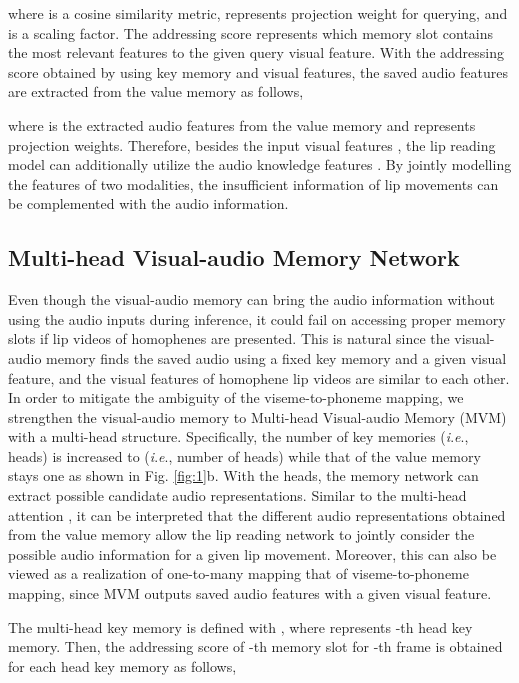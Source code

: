 \documentclass[letterpaper]{article} \usepackage{aaai22}  \usepackage{times}  \usepackage{helvet}  \usepackage{courier}  \usepackage[hyphens]{url}  \usepackage{graphicx} \urlstyle{rm} \def\UrlFont{\rm}  \usepackage{natbib}  \usepackage{caption} \DeclareCaptionStyle{ruled}{labelfont=normalfont,labelsep=colon,strut=off} \frenchspacing  \setlength{\pdfpagewidth}{8.5in}  \setlength{\pdfpageheight}{11in}  \usepackage{algorithm}
\newcommand{\ie}{\textit{i}.\textit{e}.}
\begin{document}
where  is a cosine similarity metric,  represents projection weight for querying, and  is a scaling factor. The addressing score represents which memory slot contains the most relevant features to the given query visual feature. With the addressing score  obtained by using key memory and visual features, the saved audio features are extracted from the value memory as follows,


where  is the extracted audio features from the value memory and  represents projection weights. Therefore, besides the input visual features , the lip reading model can additionally utilize the audio knowledge features . By jointly modelling the features of two modalities, the insufficient information of lip movements can be complemented with the audio information.

\subsection{Multi-head Visual-audio Memory Network}
\label{sec:3.2}
Even though the visual-audio memory can bring the audio information without using the audio inputs during inference, it could fail on accessing proper memory slots if lip videos of homophenes are presented. This is natural since the visual-audio memory finds the saved audio using a fixed key memory and a given visual feature, and the visual features of homophene lip videos are similar to each other. In order to mitigate the ambiguity of the viseme-to-phoneme mapping, we strengthen the visual-audio memory to Multi-head Visual-audio Memory (MVM) with a multi-head structure. Specifically, the number of key memories (\ie, heads) is increased to  (\ie, number of heads) while that of the value memory stays one \cite{lample2019mhmattention} as shown in Fig. \ref{fig:1}b. With the  heads, the memory network can extract possible candidate audio representations. Similar to the multi-head attention \cite{vaswani2017attention}, it can be interpreted that the  different audio representations obtained from the value memory allow the lip reading network to jointly consider the possible audio information for a given lip movement. Moreover, this can also be viewed as a realization of one-to-many mapping that of viseme-to-phoneme mapping, since MVM outputs  saved audio features with a given visual feature.

The multi-head key memory is defined with , where  represents -th head key memory. Then, the addressing score of -th memory slot for -th frame is obtained for each head key memory as follows,
\end{document}
